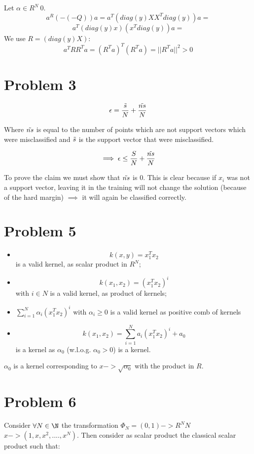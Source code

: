 \documentclass[12pt,letterpaper]{article}
\begin{document}
Let $\alpha \in R^N \ {0}$.
$$a^R(-(-Q))a = a^T(diag(y)XX^Tdiag(y))a =$$ $$a^T(diag(y)x)(x^Tdiag(y))a=$$
We use $R = (diag(y)X)$:
$$a^TRR^Ta = (R^Ta)^T(R^Ta) = ||R^Ta||^2 > 0$$


\section*{Problem 3}

$$\epsilon = \frac{\Tilde{s}}{N} + \frac{\Tilde{ns}}{N}$$

Where $\Tilde{ns}$ is equal to the number of points which are not support vectors which were misclassified and $\Tilde{s}$ is the support vector that were misclassified.

$$\implies \epsilon \leq \frac{S}{N} + \frac{\Tilde{ns}}{N} $$

To prove the claim we must show that $\Tilde{ns}$ is 0.
This is clear because if $x_i$ was not a support vector, leaving it in the training will not change the solution (because of the hard margin) $\implies$ it will again be classified correctly.

\section*{Problem 5}

\begin{itemize}
\item $$k(x,y) = x_1^Tx_2$$ is a valid kernel, as scalar product in $R^N$;
\item $$k(x_1, x_2) = (x_1^Tx_2)^i $$ with $i \in N$ is a valid kernel, as product of kernels;
\item $\sum_{i=1}^N \alpha_i(x_1^Tx_2)^i$ with $\alpha_i \geq 0$ is a valid kernel as positive comb of kernels
\item $$k(x_1, x_2) = \sum_{i=1}^N a_i(x_1^Tx_2)^i+a_0$$ is a kernel as $\alpha_0$ (w.l.o.g. $\alpha_0 > 0$) is a kernel.
\end{itemize}

$\alpha_0$ is a kernel corresponding to $x -> \sqrt{\alpha_0}$ with the product in $R$.

\section*{Problem 6}

Consider $\forall N \in \N$ the transformation $\Phi_N = (0,1) -> R^NN$ $x -> (1, x, x^2,...., x^N)$. 
Then consider as scalar product the classical scalar product such that:
\end{document}
